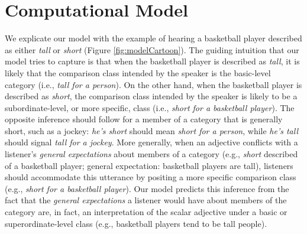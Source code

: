 \documentclass[doc]{apa6}
\begin{document}
\section{Computational Model}

We explicate our model with the example of hearing a basketball player described as either \emph{tall} or \emph{short} (Figure \ref{fig:modelCartoon}). 
The guiding intuition that our model tries to capture is that when the basketball player is described as \emph{tall}, it is likely that the comparison class intended by the speaker is the basic-level category (i.e., \emph{tall for a person}). 
On the other hand, when the basketball player is described as \emph{short}, the comparison class intended by the speaker is likely to be a subordinate-level, or more specific, class (i.e., \emph{short for a basketball player}). 
The opposite inference should follow for a member of a category that is generally short, such as a jockey: \emph{he's short} should mean \emph{short for a person}, while \emph{he's tall} should signal \emph{tall for a jockey}.
More generally, when an adjective conflicts with a listener's \emph{general expectations} about members of a category (e.g., \emph{short} described of a basketball player; general expectation: basketball players are tall), listeners should accommodate this utterance by positing a more specific comparison class (e.g., \emph{short for a basketball player}). 
Our model predicts this inference from the fact that the \emph{general expectations} a listener would have about members of the category are, in fact, an interpretation of the scalar adjective under a basic or superordinate-level class (e.g., basketball players tend to be tall people).




%
\end{document}
